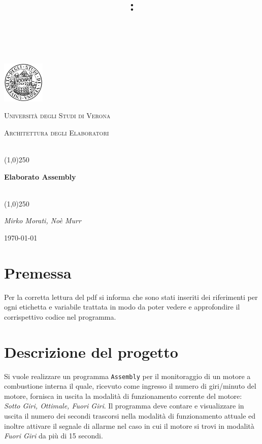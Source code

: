 \documentclass[a4paper,11pt]{article}
\title{
\vspace{2in}
\textmd{\textbf{\hmwkClass:\\ \hmwkTitle}}\\
\vspace{0.1in}\large{\textit{\hmwkAuthorName}}
\vspace{3in}
}
\newcommand{\Assembly}{\texttt{Assembly} }
\begin{document}
	\clearpage
	\begin{titlepage}
		\centering
		\vspace*{\fill}
		\includegraphics[width=0.15\textwidth]{logo.png}\par\vspace{1cm}
		{\scshape\LARGE Università degli Studi di Verona \par}
		\vspace{1cm}
		{\scshape\Large Architettura degli Elaboratori\par}
		\vspace{1.5cm}
		\\ \line(1,0){250} \\
		{\huge\bfseries Elaborato Assembly\par}
		\\ \line(1,0){250} \\
		\vspace{2cm}
		{\Large\itshape Mirko Morati, Noè Murr\par}
		\vspace{5cm}
		\vspace*{\fill}
		{\large \today\par}
	\end{titlepage}
	\thispagestyle{empty}
	\newpage
	\tableofcontents
	\newpage
	
	\section{Premessa}
	Per la corretta lettura del pdf si informa che sono stati inseriti dei riferimenti per ogni etichetta e variabile trattata in modo da poter vedere e approfondire il corrispettivo codice nel programma. 
	
	\section{Descrizione del progetto}
	Si vuole realizzare un programma \Assembly per il monitoraggio di un motore a combustione interna il quale, ricevuto come ingresso il numero di giri/minuto del motore, fornisca in uscita la modalità di funzionamento corrente del motore: \textit{Sotto Giri, Ottimale, Fuori Giri}. Il programma deve contare e visualizzare in uscita il numero dei secondi trascorsi nella modalità di funzionamento attuale ed inoltre attivare il segnale di allarme nel caso in cui il motore si trovi in modalità \textit{Fuori Giri} da più di 15 secondi.
	
\end{document}
